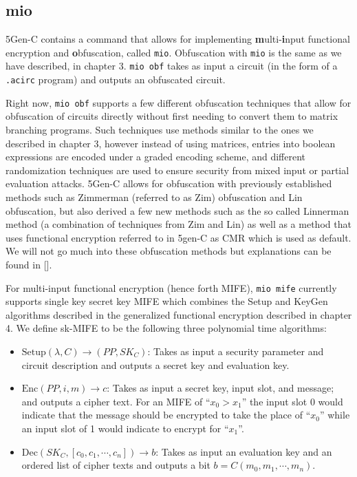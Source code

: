 \documentclass[12pt,twoside]{reedthesis}
\newcommand{\enc}[0]{\text{Enc}}
\newcommand{\dec}[0]{\text{Dec}}
\begin{document}
          \subsection{mio}
    \par 5Gen-C contains a command that allows for implementing \textbf{m}ulti-\textbf{i}nput functional encryption and \textbf{o}bfuscation, called \texttt{mio}. Obfuscation with \texttt{mio} is the same as we have described, in chapter 3. \texttt{mio obf} takes as input a circuit (in the form of a \texttt{.acirc} program) and outputs an obfuscated circuit.
    \par Right now, \texttt{mio obf} supports a few different obfuscation techniques that allow for obfuscation of circuits directly without first needing to convert them to matrix branching programs. Such techniques use methods similar to the ones we described in chapter 3, however instead of using matrices, entries into boolean expressions are encoded under a graded encoding scheme, and different randomization techniques are used to ensure security from mixed input or partial evaluation attacks. 5Gen-C allows for obfuscation with previously established methods such as Zimmerman (referred to as Zim) obfuscation and Lin obfuscation, but also derived a few new methods such as the so called Linnerman method (a combination of techniques from Zim and Lin) as well as a method that uses functional encryption referred to in 5gen-C as CMR which is used as default. We will not go much into these obfuscation methods but explanations can be found in [\cite{5genc}].
    \par For multi-input functional encryption (hence forth MIFE), \texttt{mio mife} currently supports single key secret key MIFE which combines the Setup and KeyGen algorithms described in the generalized functional encryption described in chapter 4. We define sk-MIFE to be the following three polynomial time algorithms:
    \begin{itemize}
       \item$ \text{Setup}(\lambda,C) \to (PP,SK_C)$:
        Takes as input a security parameter and circuit description and outputs a secret key and evaluation key. 
        \item $\enc(PP,i,m) \to c$:
        Takes as input a secret key, input slot, and message; and outputs a cipher text. For an MIFE of ``$x_0>x_1$'' the input slot 0 would indicate that the message should be encrypted to take the place of ``$x_0$'' while an input slot of 1 would indicate to encrypt for ``$x_1$''.    
        \item $\dec(SK_C,[c_0,c_1,\cdots,c_n]) \to b$:
        Takes as input an evaluation key and an ordered list of cipher texts and outputs a bit $b = C(m_0,m_1,\cdots,m_n)$.
        \end{itemize}
\end{document}
